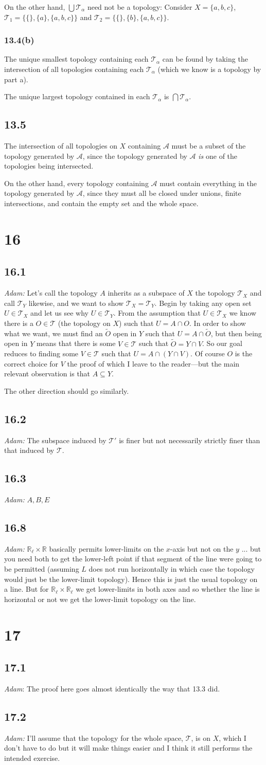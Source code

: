 \documentclass{article}
\newcommand\s{\section*}
\renewcommand\ss{\subsection*}
\newcommand\sss{\subsubsection*}
\begin{document}
On the other hand, $\bigcup\mathcal{T}_\alpha$ need not be a topology: Consider $X=\{a,b,c\}$, $\mathcal{T}_1 = \{\{\},\{a\},\{a,b,c\}\}$ and $\mathcal{T}_2=\{\{\},\{b\},\{a,b,c\}\}$.
\sss{13.4(b)}
The unique smallest topology containing each $\mathcal{T}_\alpha$ can be found by taking the intersection of all topologies containing each $\mathcal{T}_\alpha$ (which we know is a topology by part a).

The unique largest topology contained in each $\mathcal{T}_\alpha$ is $\bigcap\mathcal{T}_\alpha$.
\ss{13.5}
The intersection of all topologies on $X$ containing $\mathcal{A}$ must be a subset of the topology generated by $\mathcal{A}$, since the topology generated by $\mathcal{A}$ \textit{is} one of the topologies being intersected.

On the other hand, every topology containing $\mathcal{A}$ must contain everything in the topology generated by $\mathcal{A}$, since they must all be closed under unions, finite intersections, and contain the empty set and the whole space.
\s{16}
\ss{16.1} {\it Adam:} Let's call the topology $A$ inherits as a subspace of $X$ the topology $\mathcal{T}_X$ and call $\mathcal{T}_Y$ likewise, and we want to show $\mathcal{T}_X=\mathcal{T}_Y$.  Begin by taking any open set $U\in \mathcal{T}_X$ and let us see why $U\in \mathcal{T}_Y$.  From the assumption that $U\in \mathcal{T}_X$ we know there is a $O\in \mathcal{T}$ (the topology on $X$) such that $U=A\cap O$.  In order to show what we want, we must find an $\tilde{O}$ open in $Y$ such that $U = A\cap \tilde{O}$, but then being open in $Y$ means that there is some $V\in \mathcal{T}$ such that $\tilde{O}=Y\cap V$.  So our goal reduces to finding some $V\in \mathcal{T}$ such that $U=A\cap (Y\cap V)$. Of course $O$ is the correct choice for $V$ the proof of which I leave to the reader---but the main relevant observation is that $A\subseteq Y$.

The other direction should go similarly.
\ss{16.2} {\it Adam:} The subspace induced by $\mathcal{T}'$ is finer but not necessarily strictly finer than that induced by $\mathcal{T}$.
\ss{16.3} {\it Adam:} $A,B,E$
\ss{16.8} {\it Adam:} $\mathbb{R}_\ell\times \mathbb{R}$ basically permits lower-limits on the $x$-axis but not on the $y$ ... but you need both to get the lower-left point if that segment of the line were going to be permitted (assuming $L$ does not run horizontally in which case the topology would just be the lower-limit topology).  Hence this is just the usual topology on a line.  But for $\mathbb{R}_\ell\times \mathbb{R}_\ell$ we get lower-limits in both axes and so whether the line is horizontal or not we get the lower-limit topology on the line.  
\s{17}
\ss{17.1} {\it Adam}: The proof here goes almost identically the way that 13.3 did.
\ss{17.2} {\it Adam:} I'll assume that the topology for the whole space, $\mathcal{T}$, is on $X$, which I don't have to do but it will make things easier and I think it still performs the intended exercise.  
\end{document}
